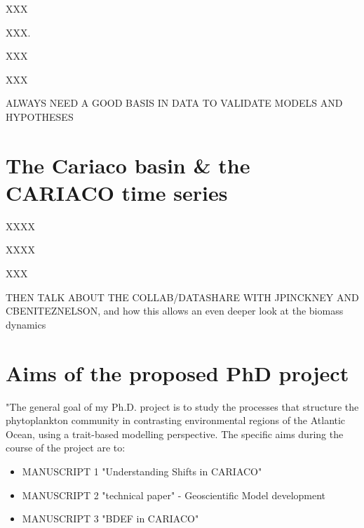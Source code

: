XXX

XXX. 

XXX

XXX

ALWAYS NEED A GOOD BASIS IN DATA TO VALIDATE MODELS AND HYPOTHESES

\section{The Cariaco basin \& the CARIACO time series}
XXXX

XXXX

XXX

THEN TALK ABOUT THE COLLAB/DATASHARE WITH JPINCKNEY AND CBENITEZNELSON, and how this allows an even deeper look at the biomass dynamics


\section{Aims of the proposed PhD project}
"The general goal of my Ph.D. project is to study the processes that structure the phytoplankton community in contrasting environmental regions of the Atlantic Ocean, using a trait-based modelling perspective. The specific aims during the course of the project are to:

\begin{itemize}
\item MANUSCRIPT 1 "Understanding Shifts in CARIACO"
\item MANUSCRIPT 2 "technical paper" - Geoscientific Model development
\item MANUSCRIPT 3 "BDEF in CARIACO"
\end{itemize}
